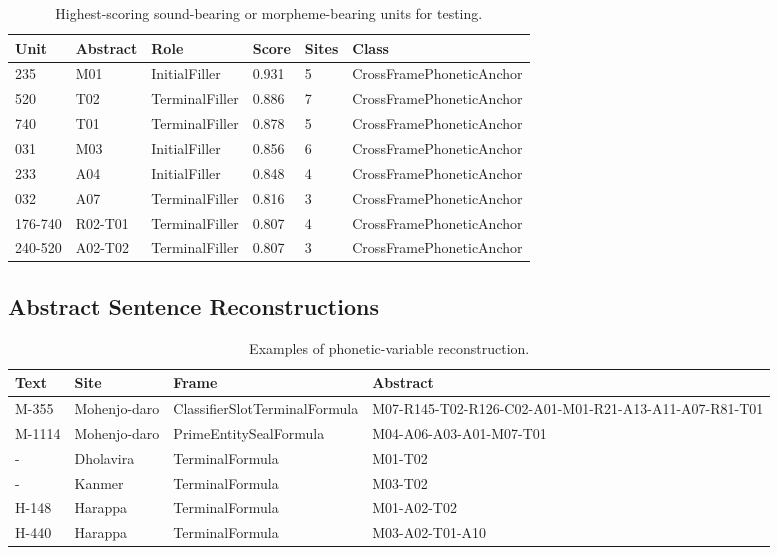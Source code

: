 \begin{table}[htbp]
\centering
\footnotesize
\begin{tabular}{llllll}
\toprule
\textbf{Unit} & \textbf{Abstract} & \textbf{Role} & \textbf{Score} & \textbf{Sites} & \textbf{Class} \\
\midrule
235 & M01 & InitialFiller & 0.931 & 5 & CrossFramePhoneticAnchor \\
520 & T02 & TerminalFiller & 0.886 & 7 & CrossFramePhoneticAnchor \\
740 & T01 & TerminalFiller & 0.878 & 5 & CrossFramePhoneticAnchor \\
031 & M03 & InitialFiller & 0.856 & 6 & CrossFramePhoneticAnchor \\
233 & A04 & InitialFiller & 0.848 & 4 & CrossFramePhoneticAnchor \\
032 & A07 & TerminalFiller & 0.816 & 3 & CrossFramePhoneticAnchor \\
176-740 & R02-T01 & TerminalFiller & 0.807 & 4 & CrossFramePhoneticAnchor \\
240-520 & A02-T02 & TerminalFiller & 0.807 & 3 & CrossFramePhoneticAnchor \\
\bottomrule
\end{tabular}
\caption{Highest-scoring sound-bearing or morpheme-bearing units for testing.}
\end{table}

\subsection{Abstract Sentence Reconstructions}

\begin{table}[htbp]
\centering
\footnotesize
\begin{tabular}{lllp{}}
\toprule
\textbf{Text} & \textbf{Site} & \textbf{Frame} & \textbf{Abstract} \\
\midrule
M-355 & Mohenjo-daro & ClassifierSlotTerminalFormula & M07-R145-T02-R126-C02-A01-M01-R21-A13-A11-A07-R81-T01 \\
M-1114 & Mohenjo-daro & PrimeEntitySealFormula & M04-A06-A03-A01-M07-T01 \\
- & Dholavira & TerminalFormula & M01-T02 \\
- & Kanmer & TerminalFormula & M03-T02 \\
H-148 & Harappa & TerminalFormula & M01-A02-T02 \\
H-440 & Harappa & TerminalFormula & M03-A02-T01-A10 \\
\bottomrule
\end{tabular}
\caption{Examples of phonetic-variable reconstruction.}
\end{table}


